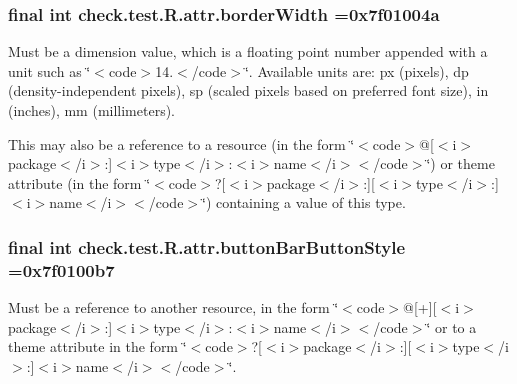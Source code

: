 \subsubsection[{border\+Width}]{\setlength{\rightskip}{0pt plus 5cm}final int check.\+test.\+R.\+attr.\+border\+Width =0x7f01004a\hspace{0.3cm}{\ttfamily [static]}}\label{classcheck_1_1test_1_1_r_1_1attr_a8707713c11a1157d48bae6aca2c70613}
Must be a dimension value, which is a floating point number appended with a unit such as \char`\"{}$<$code$>$14.\+5sp$<$/code$>$\char`\"{}. Available units are\+: px (pixels), dp (density-\/independent pixels), sp (scaled pixels based on preferred font size), in (inches), mm (millimeters). 

This may also be a reference to a resource (in the form \char`\"{}$<$code$>$@\mbox{[}$<$i$>$package$<$/i$>$\+:\mbox{]}$<$i$>$type$<$/i$>$\+:$<$i$>$name$<$/i$>$$<$/code$>$\char`\"{}) or theme attribute (in the form \char`\"{}$<$code$>$?\mbox{[}$<$i$>$package$<$/i$>$\+:\mbox{]}\mbox{[}$<$i$>$type$<$/i$>$\+:\mbox{]}$<$i$>$name$<$/i$>$$<$/code$>$\char`\"{}) containing a value of this type. \hypertarget{classcheck_1_1test_1_1_r_1_1attr_a109ef78c6f65afeee8c7cc0206f19777}{}
\subsubsection[{button\+Bar\+Button\+Style}]{\setlength{\rightskip}{0pt plus 5cm}final int check.\+test.\+R.\+attr.\+button\+Bar\+Button\+Style =0x7f0100b7\hspace{0.3cm}{\ttfamily [static]}}\label{classcheck_1_1test_1_1_r_1_1attr_a109ef78c6f65afeee8c7cc0206f19777}
Must be a reference to another resource, in the form \char`\"{}$<$code$>$@\mbox{[}+\mbox{]}\mbox{[}$<$i$>$package$<$/i$>$\+:\mbox{]}$<$i$>$type$<$/i$>$\+:$<$i$>$name$<$/i$>$$<$/code$>$\char`\"{} or to a theme attribute in the form \char`\"{}$<$code$>$?\mbox{[}$<$i$>$package$<$/i$>$\+:\mbox{]}\mbox{[}$<$i$>$type$<$/i$>$\+:\mbox{]}$<$i$>$name$<$/i$>$$<$/code$>$\char`\"{}. \hypertarget{classcheck_1_1test_1_1_r_1_1attr_aa15b2310541c468ff8359b79c844bdb6}{}
